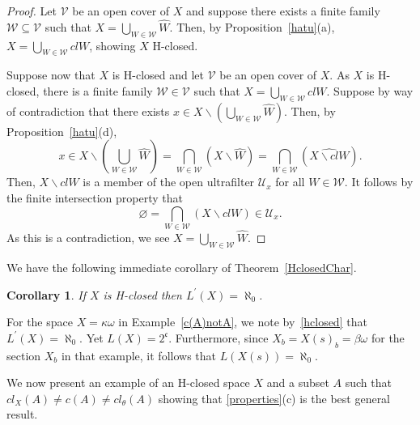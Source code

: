 \documentclass[11pt]{amsart}
\newif\ifdraft\draftfalse
\newtheorem{corollary}[theorem]{Corollary}
\theoremstyle{definition}
\theoremstyle{remark}
\numberwithin{equation}{section}
\begin{document}
\begin{proof}
Let ${\ensuremath{\mathcal{{V}}}}$ be an open cover of $X$ and suppose there exists a finite family ${\ensuremath{\mathcal{{W}}}}{\subseteq}{\ensuremath{\mathcal{{V}}}}$ such that $X={\bigcup}_{W\in{\ensuremath{\mathcal{{W}}}}}\widehat{W}$. Then, by Proposition~\ref{hatu}(a), $X={\bigcup}_{W\in{\ensuremath{\mathcal{{W}}}}}clW$, showing $X$ H-closed.

Suppose now that $X$ is H-closed and let ${\ensuremath{\mathcal{{V}}}}$ be an open cover of $X$. As $X$ is H-closed, there is a finite family ${\ensuremath{\mathcal{{W}}}}\in{\ensuremath{\mathcal{{V}}}}$ such that $X={\bigcup}_{W\in{\ensuremath{\mathcal{{W}}}}}clW$. Suppose by way of contradiction that there exists $x\in X{\backslash}({\bigcup}_{W\in{\ensuremath{\mathcal{{W}}}}}\widehat{W})$. Then, by Proposition~\ref{hatu}(d), 
$$x\in X{\backslash}({\bigcup}_{W\in{\ensuremath{\mathcal{{W}}}}}\widehat{W})={\bigcap}_{W\in{\ensuremath{\mathcal{{W}}}}}(X{\backslash}\widehat{W})={\bigcap}_{W\in{\ensuremath{\mathcal{{W}}}}}(\widehat{X{\backslash} clW}).$$
Then, $X{\backslash} clW$ is a member of the open ultrafilter ${\ensuremath{\mathcal{{U}}}}_x$ for all $W\in{\ensuremath{\mathcal{{W}}}}$. It follows by the finite intersection property that
$${\varnothing}={\bigcap}_{W\in{\ensuremath{\mathcal{{W}}}}}(X{\backslash} clW)\in{\ensuremath{\mathcal{{U}}}}_x.$$
As this is a contradiction, we see $X={\bigcup}_{W\in{\ensuremath{\mathcal{{W}}}}}\widehat{W}$.
\end{proof}
We have the following immediate corollary of Theorem~\ref{HclosedChar}.
\begin{corollary}{{\immediate{}}{\ifdraft\hspace{-\lastskip}\vadjust{\vspace{-1mm}\smash{\llap{{\tt {{hclosed}}}\hspace{8mm}}}\vspace{1mm}}\fi}}
If $X$ is H-closed then $L^\prime(X)=\aleph_0$.
\end{corollary}

For the space $X=\kappa\omega$ in Example~\ref{c(A)notA}, we note by~\ref{hclosed} that $L^\prime(X)=\aleph_0$. Yet $L(X)=2^\mathfrak{c}$. Furthermore, since $X_b=X(s)_b=\beta\omega$ for the section $X_b$ in that example, it follows that $L(X(s))=\aleph_0$.

\vskip 1mm

We now present an example of an H-closed space $X$ and a subset $A$ such that $cl_X(A) \ne c(A) \ne cl_{\theta}(A)$ showing that \ref{properties}(c) is the best general result.
\end{document}
